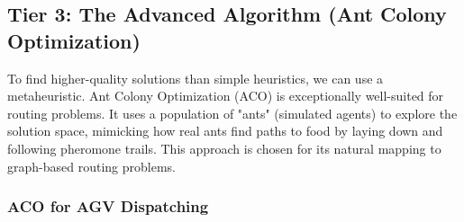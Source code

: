 \documentclass{article}
\begin{document}


\subsection*{Tier 3: The Advanced Algorithm (Ant Colony Optimization)}
To find higher-quality solutions than simple heuristics, we can use a metaheuristic. Ant Colony Optimization (ACO) is exceptionally well-suited for routing problems. It uses a population of "ants" (simulated agents) to explore the solution space, mimicking how real ants find paths to food by laying down and following pheromone trails. This approach is chosen for its natural mapping to graph-based routing problems.

\subsubsection*{ACO for AGV Dispatching}
\end{document}
